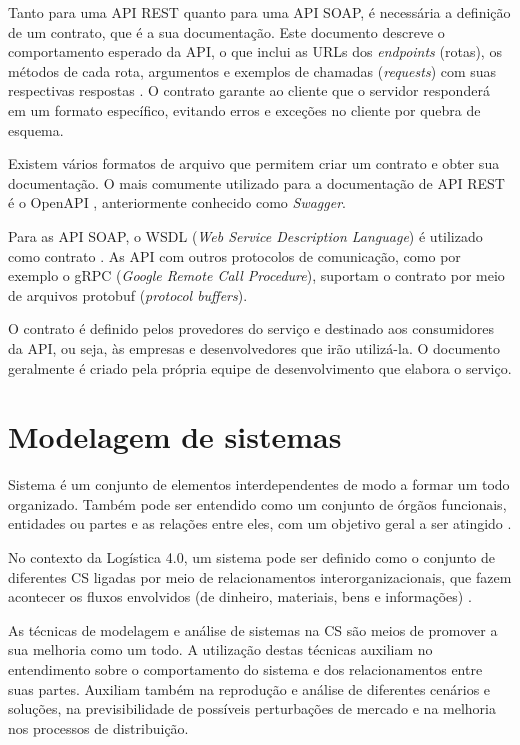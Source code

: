 Tanto para uma API REST quanto para uma API SOAP, é necessária a definição de um contrato, que é a sua documentação. Este documento descreve o comportamento esperado da API, o que inclui as URLs dos \textit{endpoints} (rotas), os métodos de cada rota, argumentos e exemplos de chamadas (\textit{requests}) com suas respectivas respostas \cite{santos2020apicontract}. O contrato garante ao cliente que o servidor responderá em um formato específico, evitando erros e exceções no cliente por quebra de esquema.

Existem vários formatos de arquivo que permitem criar um contrato e obter sua documentação. O mais comumente utilizado para a documentação de API REST é o OpenAPI \cite{santos2020openapi}, anteriormente conhecido como \textit{Swagger}.

Para as API SOAP, o WSDL (\textit{Web Service Description Language}) é utilizado como contrato \cite{booth2004webservice}. As API com outros protocolos de comunicação, como por exemplo o gRPC (\textit{Google Remote Call Procedure}), suportam o contrato por meio de arquivos protobuf (\textit{protocol buffers}).

O contrato é definido pelos provedores do serviço e destinado aos consumidores da API, ou seja, às empresas e desenvolvedores que irão utilizá-la. O documento geralmente é criado pela própria equipe de desenvolvimento que elabora o serviço.

\section{Modelagem de sistemas}
\label{sec:modelagem-de-sistemas}

Sistema é um conjunto de elementos interdependentes de modo a formar um todo organizado. Também pode ser entendido como um conjunto de órgãos funcionais, entidades ou partes e as relações entre eles, com um objetivo geral a ser atingido \cite{mulbert2005sistemas}.

No contexto da Logística 4.0, um sistema pode ser definido como o conjunto de diferentes CS ligadas por meio de relacionamentos interorganizacionais, que fazem acontecer os fluxos envolvidos (de dinheiro, materiais, bens e informações) \cite{oliveira2016supplychain}.

As técnicas de modelagem e análise de sistemas na CS são meios de promover a sua melhoria como um todo. A utilização destas técnicas auxiliam no entendimento sobre o comportamento do sistema e dos relacionamentos entre suas partes. Auxiliam também na reprodução e análise de diferentes cenários e soluções, na previsibilidade de possíveis perturbações de mercado e na melhoria nos processos de distribuição.

